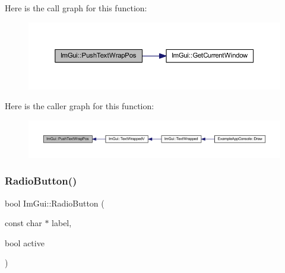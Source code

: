 Here is the call graph for this function\+:
\nopagebreak
\begin{figure}[H]
\begin{center}
\leavevmode
\includegraphics[width=350pt]{namespace_im_gui_ab3b203dc94e7ee61a524609b3f3be50a_cgraph}
\end{center}
\end{figure}
Here is the caller graph for this function\+:
\nopagebreak
\begin{figure}[H]
\begin{center}
\leavevmode
\includegraphics[width=350pt]{namespace_im_gui_ab3b203dc94e7ee61a524609b3f3be50a_icgraph}
\end{center}
\end{figure}
\mbox{\label{namespace_im_gui_a6b146763845cbad5a4144772279631bc}} 
\subsubsection{\texorpdfstring{Radio\+Button()}{RadioButton()}\hspace{0.1cm}{\footnotesize\ttfamily [1/2]}}
{\footnotesize\ttfamily bool Im\+Gui\+::\+Radio\+Button (\begin{DoxyParamCaption}\item[{const char $\ast$}]{label,  }\item[{bool}]{active }\end{DoxyParamCaption})}

